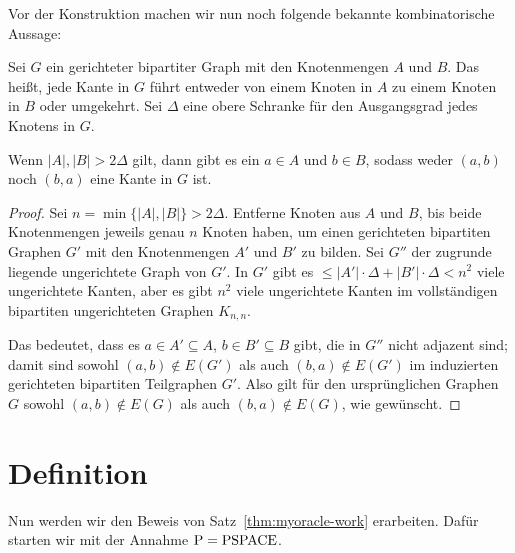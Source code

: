 Vor der Konstruktion machen wir nun noch folgende bekannte kombinatorische Aussage:
\begin{lemma}\label{lemma:bipartite}
    Sei $G$ ein gerichteter bipartiter Graph mit den Knotenmengen $A$ und $B$.
    Das heißt, jede Kante in $G$ führt entweder von einem Knoten in $A$ zu einem Knoten in $B$ oder umgekehrt.
    Sei $\Delta$ eine obere Schranke für den Ausgangsgrad jedes Knotens in $G$.

    Wenn $|A|,|B|>2\Delta$ gilt, dann gibt es ein $a\in A$ und $b\in B$, sodass weder $(a,b)$ noch $(b,a)$ eine Kante in $G$ ist.
\end{lemma}
\begin{proof}
    Sei $n=\min\{|A|,|B|\}>2\Delta$.
    Entferne Knoten aus $A$ und $B$, bis beide Knotenmengen jeweils genau $n$ Knoten haben, um einen gerichteten bipartiten Graphen $G'$ mit den Knotenmengen $A'$ und $B'$ zu bilden.
    Sei $G''$ der zugrunde liegende ungerichtete Graph von $G'$.
    In $G'$ gibt es $\leq |A'|\cdot \Delta + |B'|\cdot\Delta<n^2$ viele ungerichtete Kanten,
    aber es gibt $n^2$ viele ungerichtete Kanten im vollständigen bipartiten ungerichteten Graphen $K_{n,n}$.

    Das bedeutet, dass es $a\in A'\subseteq A$, $b\in B'\subseteq B$ gibt, die in $G''$ nicht adjazent sind; damit sind sowohl $(a,b)\not\in E(G')$ als auch $(b,a)\not\in E(G')$ im induzierten gerichteten bipartiten Teilgraphen $G'$.
    Also gilt für den ursprünglichen Graphen $G$ sowohl $(a,b)\not\in E(G)$ als auch $(b,a)\not\in E(G)$, wie gewünscht.
\end{proof}

\section{Definition}\label{sec:oracle-definition}

Nun werden wir den Beweis von Satz~\ref{thm:myoracle-work} erarbeiten. Dafür starten wir mit der Annahme $\mathrm{P}=\mathrm{PSPACE}$.

